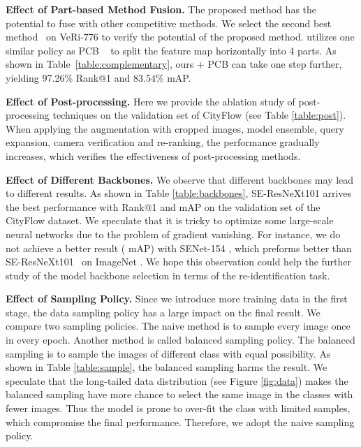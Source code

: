 \documentclass[journal]{IEEEtran}
\begin{document}
\noindent \textbf{Effect of Part-based Method Fusion.} The proposed method has the potential to fuse with other competitive methods. We select the second best method~\cite{qian2019stripe} on VeRi-776 to verify the potential of the proposed method. \cite{qian2019stripe} utilizes one similar policy as PCB ~\cite{sun2017beyond} to split the feature map horizontally into 4 parts. As shown in Table~\ref{table:complementary}, ours + PCB can take one step further, yielding 97.26\% Rank@1 and 83.54\% mAP.

\noindent \textbf{Effect of Post-processing.} Here we provide the ablation study of post-processing techniques on the validation set of CityFlow (see Table \ref{table:post}). When applying the augmentation with cropped images, model ensemble, query expansion, camera verification and re-ranking, the performance gradually increases, which verifies the effectiveness of post-processing methods. 

\noindent \textbf{Effect of Different Backbones.} We observe that different backbones may lead to different results. As shown in Table \ref{table:backbones}, SE-ResNeXt101 \cite{hu2018senet} arrives the best performance with  Rank@1 and  mAP on the validation set of the CityFlow dataset. We speculate that it is tricky to optimize some large-scale neural networks due to the problem of gradient vanishing. For instance, we do not achieve a better result ( mAP) with SENet-154 \cite{hu2018senet}, which preforms better than SE-ResNeXt101~\cite{hu2018senet} on ImageNet \cite{deng2009imagenet}. We hope this observation could help the further study of the model backbone selection in terms of the re-identification task.

\noindent \textbf{Effect of Sampling Policy.} 
Since we introduce more training data in the first stage, the data sampling policy has a large impact on the final result. We compare two sampling policies. The naive method is to sample every image once in every epoch. Another method is called balanced sampling policy. The balanced sampling is to sample the images of different class with equal possibility. As shown in Table \ref{table:sample}, the balanced sampling harms the result. We speculate that the long-tailed data distribution (see Figure \ref{fig:data}) makes the balanced sampling have more chance to select the same image in the classes with fewer images. Thus the model is prone to over-fit the class with limited samples, which compromise the final performance. Therefore, we adopt the naive sampling policy. 
\end{document}
